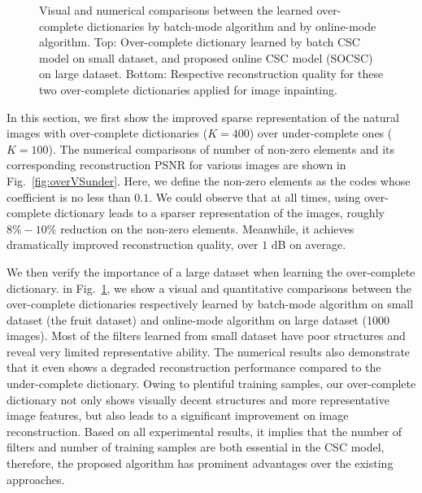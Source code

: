 \documentclass[10pt,twocolumn,letterpaper]{article}
\begin{document}
\begin{figure}[h]
  \caption{ Visual and numerical comparisons between the learned over-complete dictionaries by batch-mode algorithm and by online-mode algorithm. Top: Over-complete dictionary learned by batch CSC model on small dataset, and proposed online CSC model (SOCSC) on large dataset. Bottom: Respective reconstruction quality for these two over-complete dictionaries applied for image inpainting.}
  \label{fig:overCompleteDic-dataset}
\end{figure}

In this section, we first show the improved sparse representation of the natural images with over-complete dictionaries ($K=400$) over under-complete ones ($K=100$). The numerical comparisons of number of non-zero elements and its corresponding reconstruction PSNR for various images are shown in Fig.~\ref{fig:overVSunder}. Here, we define the non-zero elements as the codes whose coefficient is no less than $0.1$. We could observe that at all times, using over-complete dictionary leads to a sparser representation of the images, roughly $8\%-10\%$ reduction on the non-zero elements. Meanwhile, it achieves dramatically improved reconstruction quality, over $1$ dB on average.

We then verify the importance of a large dataset when learning the over-complete dictionary. in Fig.~\ref{fig:overCompleteDic-dataset}, we show a visual and quantitative comparisons between the over-complete dictionaries respectively learned by batch-mode algorithm on small dataset (the fruit dataset) and online-mode algorithm on large dataset (1000 images). Most of the filters learned from small dataset have poor structures and reveal very limited representative ability. The numerical results also demonstrate that it even shows a degraded reconstruction performance compared to the under-complete dictionary. Owing to plentiful training samples, our over-complete dictionary not only shows visually decent structures and more representative image features, but also leads to a significant improvement on image reconstruction. Based on all experimental results, it implies that the number of filters and number of training samples are both essential in the CSC model, therefore, the proposed algorithm has prominent advantages over the existing approaches.
\end{document}

